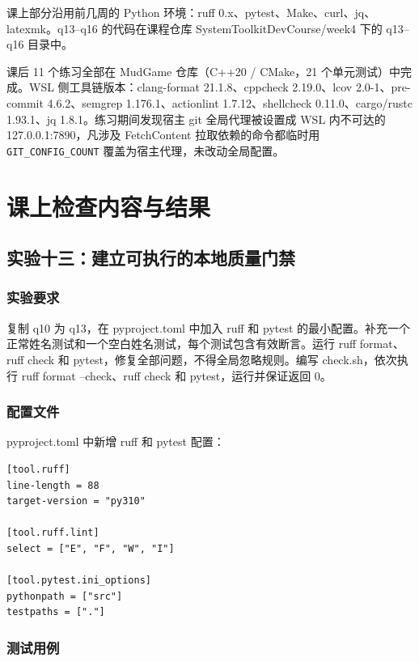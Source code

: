 \documentclass[UTF8]{ctexart}
\begin{document}
课上部分沿用前几周的 Python 环境：ruff 0.x、pytest、Make、curl、jq、latexmk。q13--q16 的代码在课程仓库 SystemToolkitDevCourse/week4 下的 q13--q16 目录中。

课后 11 个练习全部在 MudGame 仓库（C++20 / CMake，21 个单元测试）中完成。WSL 侧工具链版本：clang-format 21.1.8、cppcheck 2.19.0、lcov 2.0-1、pre-commit 4.6.2、semgrep 1.176.1、actionlint 1.7.12、shellcheck 0.11.0、cargo/rustc 1.93.1、jq 1.8.1。练习期间发现宿主 git 全局代理被设置成 WSL 内不可达的 127.0.0.1:7890，凡涉及 FetchContent 拉取依赖的命令都临时用 \texttt{GIT\_CONFIG\_COUNT} 覆盖为宿主代理，未改动全局配置。

\section{课上检查内容与结果}

\subsection{实验十三：建立可执行的本地质量门禁}

\subsubsection{实验要求}

复制 q10 为 q13，在 pyproject.toml 中加入 ruff 和 pytest 的最小配置。补充一个正常姓名测试和一个空白姓名测试，每个测试包含有效断言。运行 ruff format、ruff check 和 pytest，修复全部问题，不得全局忽略规则。编写 check.sh，依次执行 ruff format --check、ruff check 和 pytest，运行并保证返回 0。

\subsubsection{配置文件}

pyproject.toml 中新增 ruff 和 pytest 配置：

\begin{lstlisting}
[tool.ruff]
line-length = 88
target-version = "py310"

[tool.ruff.lint]
select = ["E", "F", "W", "I"]

[tool.pytest.ini_options]
pythonpath = ["src"]
testpaths = ["."]
\end{lstlisting}

\subsubsection{测试用例}
\end{document}
